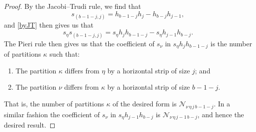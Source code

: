 \documentclass[12pt]{article}
\begin{document}
\begin{proof} 
 By the Jacobi--Trudi rule, we find that 
\begin{equation}\label{byJT}
 s_{(b-1-j, j)} = h_{b-1-j} h_{j} - h_{b-j} h_{j-1}, 
\end{equation}
 and \eqref{byJT} then gives us that $$ s_{\eta} s_{(b-1-j,j) } = s_{\eta} h_{j} h_{b - 1 - j} - s_{\eta} h_{j-1} h_{b - j}. $$ The Pieri rule then 
 gives us that the coefficient of $s_{\nu}$ in $s_{\eta} h_{j} h_{b - 1 - j}$ is the number of partitions $\kappa$ such that: 

\begin{enumerate}

\item The partition $\kappa$ differs from $\eta$ by a horizontal strip of size $j$; and

\item The partition $\nu$ differs from $\kappa$ by a horizontal strip of size $b - 1 - j$. 

\end{enumerate}

\noindent That is, the number of partitions $\kappa$ of the desired form is $\mathcal{N}_{\nu \, \eta \, j \, b-1-j}$. In a similar fashion 
 the coefficient of $s_{\nu}$ in $s_{\eta} h_{j-1} h_{b - j} $ is $\mathcal{N}_{\nu \, \eta \, j-1 \, b-j}$, and hence the desired result. 
\end{proof}
\end{document}
